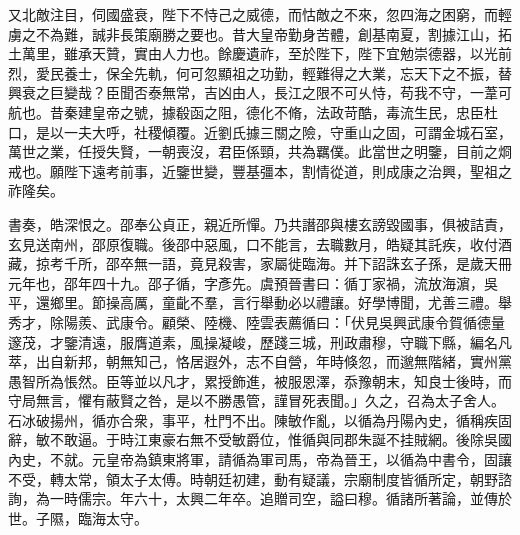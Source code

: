 \begin{pinyinscope}
又北敵注目，伺國盛衰，陛下不恃己之威德，而怙敵之不來，忽四海之困窮，而輕虜之不為難，誠非長策廟勝之要也。昔大皇帝勤身苦體，創基南夏，割據江山，拓土萬里，雖承天贊，實由人力也。餘慶遺祚，至於陛下，陛下宜勉崇德器，以光前烈，愛民養士，保全先軌，何可忽顯祖之功勤，輕難得之大業，忘天下之不振，替興衰之巨變哉？臣聞否泰無常，吉凶由人，長江之限不可乆恃，苟我不守，一葦可航也。昔秦建皇帝之號，據殽函之阻，德化不脩，法政苛酷，毒流生民，忠臣杜口，是以一夫大呼，社稷傾覆。近劉氏據三關之險，守重山之固，可謂金城石室，萬世之業，任授失賢，一朝喪沒，君臣係頸，共為羈僕。此當世之明鑒，目前之烱戒也。願陛下遠考前事，近鑒世變，豐基彊本，割情從道，則成康之治興，聖祖之祚隆矣。

書奏，皓深恨之。邵奉公貞正，親近所憚。乃共譖邵與樓玄謗毀國事，俱被詰責，玄見送南州，邵原復職。後邵中惡風，口不能言，去職數月，皓疑其託疾，收付酒藏，掠考千所，邵卒無一語，竟見殺害，家屬徙臨海。并下詔誅玄子孫，是歲天冊元年也，邵年四十九。邵子循，字彥先。虞預晉書曰：循丁家禍，流放海濵，吳平，還鄉里。節操高厲，童齔不羣，言行舉動必以禮讓。好學博聞，尤善三禮。舉秀才，除陽羨、武康令。顧榮、陸機、陸雲表薦循曰：「伏見吳興武康令賀循德量邃茂，才鑒清遠，服膺道素，風操凝峻，歷踐三城，刑政肅穆，守職下縣，編名凡萃，出自新邦，朝無知己，恪居遐外，志不自營，年時倏忽，而邈無階緒，實州黨愚智所為悵然。臣等並以凡才，累授飾進，被服恩澤，忝豫朝末，知良士後時，而守局無言，懼有蔽賢之咎，是以不勝愚管，謹冒死表聞。」久之，召為太子舍人。石冰破揚州，循亦合衆，事平，杜門不出。陳敏作亂，以循為丹陽內史，循稱疾固辭，敏不敢逼。于時江東豪右無不受敏爵位，惟循與同郡朱誕不挂賊網。後除吳國內史，不就。元皇帝為鎮東將軍，請循為軍司馬，帝為晉王，以循為中書令，固讓不受，轉太常，領太子太傅。時朝廷初建，動有疑議，宗廟制度皆循所定，朝野諮詢，為一時儒宗。年六十，太興二年卒。追贈司空，謚曰穆。循諸所著論，並傳於世。子隰，臨海太守。


\end{pinyinscope}